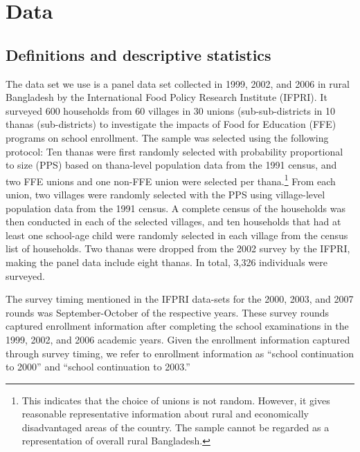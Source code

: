 \documentclass[12pt,letterpaper]{article}
\newcommand{\0}{\ensuremath{\mbox{\boldmath $0$}}}
\begin{document}
 \section{Data} 
\subsection{Definitions and descriptive statistics}

The data set we use is a panel data set collected in 1999, 2002, and 2006 in rural Bangladesh by the International Food Policy Research Institute (IFPRI). It surveyed 600 households from 60 villages in 30 unions (sub-sub-districts in 10 thanas (sub-districts) to investigate the impacts of Food for Education (FFE) programs on school enrollment. The sample was selected using the following protocol: Ten thanas were first randomly selected with probability proportional to size (PPS) based on thana-level population data from the 1991 census, and two FFE unions and one non-FFE union were selected per thana.\footnote{This indicates that the choice of unions is not random. However, it gives reasonable representative information about rural and economically disadvantaged areas of the country. The sample cannot be regarded as a representation of overall rural Bangladesh.} From each union, two villages were randomly selected with the PPS using village-level population data from the 1991 census. A complete census of the households was then conducted in each of the selected villages, and ten households that had at least one school-age child were randomly selected in each village from the census list of households. Two thanas were dropped from the 2002 survey by the IFPRI, making the panel data include eight thanas. In total, 3,326 individuals were surveyed. 

The survey timing mentioned in the IFPRI data-sets for the 2000, 2003, and 2007 rounds was September-October of the respective years. These survey rounds captured enrollment information after completing the school examinations in the 1999, 2002, and 2006 academic years. Given the enrollment information captured through survey timing, we refer to enrollment information as ``school continuation to 2000'' and ``school continuation to 2003.''
\end{document}
